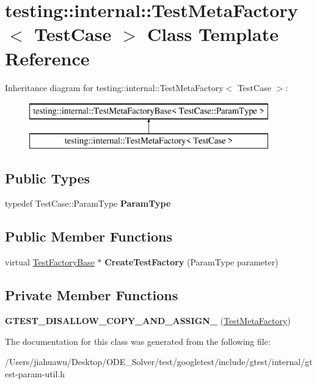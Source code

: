 \hypertarget{classtesting_1_1internal_1_1_test_meta_factory}{}\section{testing\+:\+:internal\+:\+:Test\+Meta\+Factory$<$ Test\+Case $>$ Class Template Reference}
\label{classtesting_1_1internal_1_1_test_meta_factory}
Inheritance diagram for testing\+:\+:internal\+:\+:Test\+Meta\+Factory$<$ Test\+Case $>$\+:\begin{figure}[H]
\begin{center}
\leavevmode
\includegraphics[height=2.000000cm]{classtesting_1_1internal_1_1_test_meta_factory}
\end{center}
\end{figure}
\subsection*{Public Types}
\begin{DoxyCompactItemize}
\item 
\mbox{\label{classtesting_1_1internal_1_1_test_meta_factory_a9c12e442b4389381b948ed669fcf0f84}} 
typedef Test\+Case\+::\+Param\+Type {\bfseries Param\+Type}
\end{DoxyCompactItemize}
\subsection*{Public Member Functions}
\begin{DoxyCompactItemize}
\item 
\mbox{\label{classtesting_1_1internal_1_1_test_meta_factory_ae9f5334c68af309bca8f7ec29d837e38}} 
virtual \mbox{\hyperlink{classtesting_1_1internal_1_1_test_factory_base}{Test\+Factory\+Base}} $\ast$ {\bfseries Create\+Test\+Factory} (Param\+Type parameter)
\end{DoxyCompactItemize}
\subsection*{Private Member Functions}
\begin{DoxyCompactItemize}
\item 
\mbox{\label{classtesting_1_1internal_1_1_test_meta_factory_a06dd1b73a2bb043937401fceea86c1e8}} 
{\bfseries G\+T\+E\+S\+T\+\_\+\+D\+I\+S\+A\+L\+L\+O\+W\+\_\+\+C\+O\+P\+Y\+\_\+\+A\+N\+D\+\_\+\+A\+S\+S\+I\+G\+N\+\_\+} (\mbox{\hyperlink{classtesting_1_1internal_1_1_test_meta_factory}{Test\+Meta\+Factory}})
\end{DoxyCompactItemize}


The documentation for this class was generated from the following file\+:\begin{DoxyCompactItemize}
\item 
/\+Users/jiahuawu/\+Desktop/\+O\+D\+E\+\_\+\+Solver/test/googletest/include/gtest/internal/gtest-\/param-\/util.\+h\end{DoxyCompactItemize}
